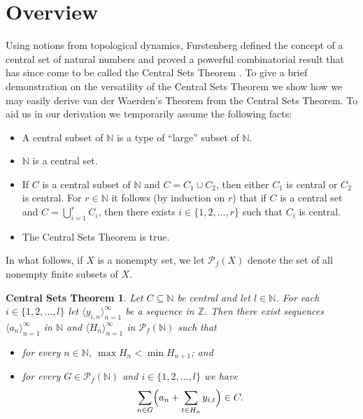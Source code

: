 \documentclass[12pt]{article}
\theoremstyle{plain}
\newtheorem{cst}[thm]{Central Sets Theorem}
\theoremstyle{definition}
\newcommand{\la}{\langle}
\newcommand{\ra}{\rangle}
\newcommand{\bbN}{\mathbb{N}}
\newcommand{\bbZ}{\mathbb{Z}}
\newcommand{\Pf}{\mathcal{P}_f}
\begin{document}
\section{Overview}
Using notions from topological dynamics, Furstenberg defined the
concept of a central set of natural numbers and proved a powerful
combinatorial result that has since come to be called the Central Sets
Theorem \cite[Proposition 8.21]{Furstenberg:1981fk}. 
To give a brief demonstration on the versatility of the Central Sets
Theorem we show how we may easily derive van der Waerden's Theorem
from the Central Sets Theorem.
To aid us in our derivation we temporarily assume the following facts:
\begin{itemize}
  \item A central subset of $\bbN$ is a type of ``large'' subset of $\bbN$.
  \item $\bbN$ is a central set.
  \item If $C$ is a central subset of $\bbN$ and $C = C_1 \cup C_2$,
    then either $C_1$ is central or $C_2$ is central.
    For $r \in \bbN$ it follows (by induction on $r$) that if $C$ is a
    central set and $C = \bigcup_{i=1}^r C_i$, then there exists $i
    \in \{1, 2, \ldots, r\}$ such that $C_i$ is central.
  \item The Central Sets Theorem is true.
\end{itemize}
In what follows, if $X$ is a nonempty set, we let $\Pf(X)$ denote the
set of all nonempty finite subsets of $X$.
\begin{cst}
  Let $C \subseteq \bbN$ be central and let $l \in \bbN$.
  For each $i \in \{1, 2, \ldots, l\}$ let $\la y_{i,n}
  \ra_{n=1}^\infty$ be a sequence in $\bbZ$.
  Then there exist sequences $\la a_n \ra_{n=1}^\infty$ in $\bbN$ and
  $\la H_n \ra_{n=1}^\infty$ in $\Pf(\bbN)$ such that 
  \begin{itemize}
    \item[(1)] for every $n \in \bbN$, $\max H_n < \min H_{n+1}$; and
    \item[(2)] for every $G \in \Pf(\bbN)$ and $i \in \{1, 2, \ldots,
      l\}$ we have
      \[
        \sum_{n \in G}\Bigl(a_n + \sum_{t \in H_n} y_{i,t}\Bigr) \in C.
      \]
  \end{itemize}
\end{cst}
\end{document}
